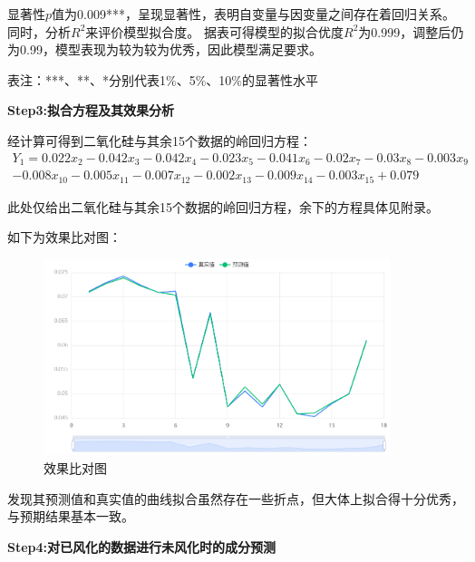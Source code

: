 \documentclass[UTF8]{ctexart}
\begin{document}
显著性$p$值为0.009***，呈现显著性，表明自变量与因变量之间存在着回归关系。同时，分析$R^2$来评价模型拟合度。
据表可得模型的拟合优度$R^2$为0.999，调整后仍为0.99，模型表现为较为较为优秀，因此模型满足要求。

表注：***、**、*分别代表1$\%$、5$\%$、10$\%$的显著性水平

\textbf{Step3:拟合方程及其效果分析}

经计算可得到二氧化硅与其余15个数据的岭回归方程：
\begin{equation}
	\begin{split}
		Y_1	= 0.022x_2-0.042x_3-0.042x_4-0.023x_5-0.041x_6-0.02x_7-0.03x_8-0.003x_9					\\
		-0.008x_{10}-0.005x_{11}-0.007x_{12}-0.002x_{13}-0.009x_{14}-0.003x_{15}+0.079
	\end{split}
\end{equation}

此处仅给出二氧化硅与其余15个数据的岭回归方程，余下的方程具体见附录。

如下为效果比对图：
\begin{figure}[H]\centering
	\includegraphics[width=0.9\textwidth]{img/效果比对图.png} %
	\caption{效果比对图} %
	\label{fig:figure 6} %
\end{figure}

发现其预测值和真实值的曲线拟合虽然存在一些折点，但大体上拟合得十分优秀，与预期结果基本一致。

\textbf{Step4:对已风化的数据进行未风化时的成分预测}
\end{document}
